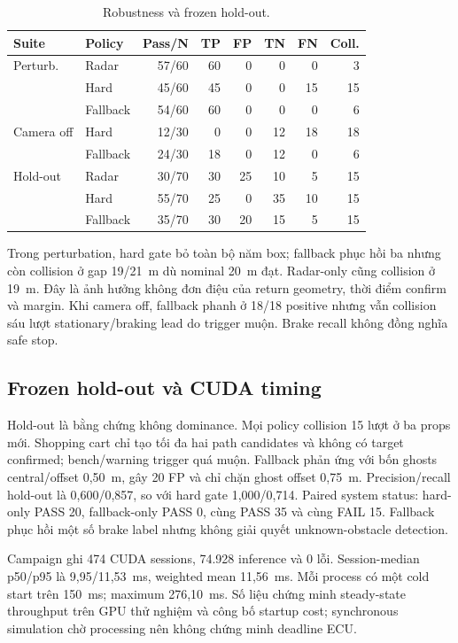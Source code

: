 \documentclass[conference]{IEEEtran}
\begin{document}
\begin{table}[t]
\caption{Robustness và frozen hold-out.}
\label{tab:extended}
\centering
\scriptsize
\setlength{\tabcolsep}{3pt}
\begin{tabular}{llrrrrrr}
\toprule
Suite & Policy & Pass/N & TP & FP & TN & FN & Coll.\\
\midrule
Perturb. & Radar & 57/60 & 60 & 0 & 0 & 0 & 3\\
 & Hard & 45/60 & 45 & 0 & 0 & 15 & 15\\
 & Fallback & 54/60 & 60 & 0 & 0 & 0 & 6\\
\midrule
Camera off & Hard & 12/30 & 0 & 0 & 12 & 18 & 18\\
 & Fallback & 24/30 & 18 & 0 & 12 & 0 & 6\\
\midrule
Hold-out & Radar & 30/70 & 30 & 25 & 10 & 5 & 15\\
 & Hard & 55/70 & 25 & 0 & 35 & 10 & 15\\
 & Fallback & 35/70 & 30 & 20 & 15 & 5 & 15\\
\bottomrule
\end{tabular}
\end{table}

Trong perturbation, hard gate bỏ toàn bộ năm box; fallback phục hồi ba nhưng còn
collision ở gap 19/21~m dù nominal 20~m đạt. Radar-only cũng collision ở 19~m.
Đây là ảnh hưởng không đơn điệu của return geometry, thời điểm confirm và margin.
Khi camera off, fallback phanh ở 18/18 positive nhưng vẫn collision sáu lượt
stationary/braking lead do trigger muộn. Brake recall không đồng nghĩa safe stop.

\subsection{Frozen hold-out và CUDA timing}
Hold-out là bằng chứng không dominance. Mọi policy collision 15 lượt ở ba props
mới. Shopping cart chỉ tạo tối đa hai path candidates và không có target
confirmed; bench/warning trigger quá muộn. Fallback phản ứng với bốn ghosts
central/offset 0,50~m, gây 20 FP và chỉ chặn ghost offset 0,75~m. Precision/recall
hold-out là 0,600/0,857, so với hard gate 1,000/0,714. Paired system status:
hard-only PASS 20, fallback-only PASS 0, cùng PASS 35 và cùng FAIL 15. Fallback
phục hồi một số brake label nhưng không giải quyết unknown-obstacle detection.

Campaign ghi 474 CUDA sessions, 74.928 inference và 0 lỗi. Session-median
p50/p95 là 9,95/11,53~ms, weighted mean 11,56~ms. Mỗi process có một cold start
trên 150~ms; maximum 276,10~ms. Số liệu chứng minh steady-state throughput trên
GPU thử nghiệm và công bố startup cost; synchronous simulation chờ processing
nên không chứng minh deadline ECU.
\end{document}
